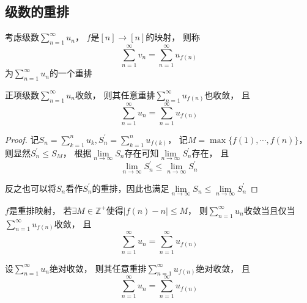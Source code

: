 \subsection{级数的重排}

\begin{definition}[重排]
  考虑级数$\sum\limits_{n = 1}^{\infty}u_n$，
  $f$是$[n] \rightarrow [n]$的映射，
  则称
  \begin{equation*}
    \sum\limits_{n = 1}^{\infty}v_n = \sum\limits_{n = 1}^{\infty} u_{f(n)}
  \end{equation*}
  为$\sum\limits_{n = 1}^{\infty}u_n$的一个重排
\end{definition}

\begin{theorem}[正项级数的重排]
  正项级数$\sum\limits_{n = 1}^{\infty}u_n$收敛，
  则其任意重排$\sum\limits_{n = 1}^{\infty}u_{f(n)}$也收敛，
  且
  \begin{equation*}
    \sum\limits_{n = 1}^{\infty}u_n = \sum\limits_{n = 1}^{\infty}u_{f(n)}
  \end{equation*}
\end{theorem}

\begin{proof}
  记$S_n = \sum\limits_{k = 1}^n u_k, S^{\prime}_n = \sum\limits_{k = 1}^n u_{f(k)}$，
  记$M = \max \{f(1),\cdots, f(n)\}$，
  则显然$S_n^{\prime} \leq S_{M}$，
  根据$\lim \limits _{n \rightarrow \infty} S_n$存在可知$\lim \limits _{n \rightarrow \infty}S_n^{\prime}$存在，
  且
  \begin{equation*}
    \lim \limits _{n \rightarrow \infty} S_n^{\prime} \leq \lim \limits _{n \rightarrow \infty} S_n^{\prime}
  \end{equation*}

  反之也可以将$S_n$看作$S_n^{\prime}$的重排，因此也满足$\lim \limits _{n \rightarrow \infty}S_n \leq \lim \limits _{n \rightarrow \infty} S_n^{\prime}$
\end{proof}

\begin{theorem}[一般项级数的重排]
  $f$是重排映射，
  若$\exists M \in \mathbb{Z}^+$使得$|f(n) - n| \leq M$，
  则$\sum\limits_{n = 1}^{\infty} u_n$收敛当且仅当$\sum\limits_{n = 1}^{\infty} u_{f(n)}$收敛，
  且
  \begin{equation*}
    \sum\limits_{n = 1}^{\infty }u_n = \sum\limits_{n = 1}^{\infty} u_{f(n)}
  \end{equation*}
\end{theorem}

\begin{theorem}[绝对收敛级数的重排]
  设$\sum\limits_{n = 1}^{\infty}u_n$绝对收敛，
  则其任意重排$\sum\limits_{n = 1}^{\infty}u_{f(n)}$绝对收敛，
  且
  \begin{equation*}
    \sum\limits_{n = 1}^{\infty}u_n = \sum\limits_{n = 1}^{\infty}u_{f(n)}
  \end{equation*}
\end{theorem}

